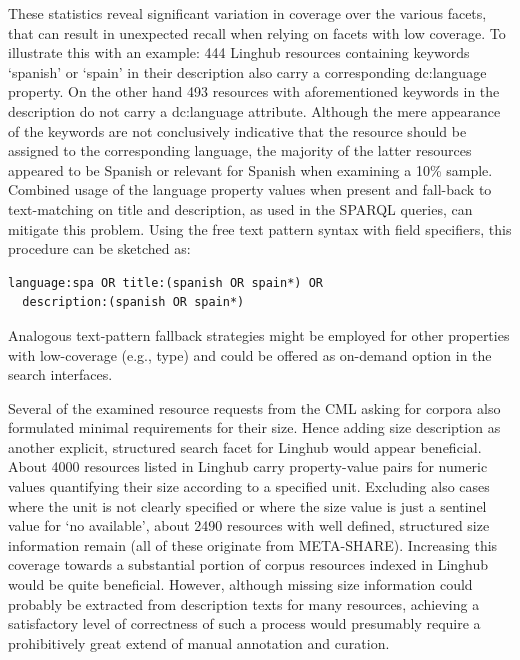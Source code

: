 \documentclass[smallextended]{svjour3}       %
\begin{document}
These statistics reveal significant variation in coverage over the various
facets, that can result in unexpected recall when relying on facets with low
coverage. To illustrate this with an example: 444 Linghub resources containing
keywords `spanish' or `spain' in their description also carry a corresponding
dc:language property. On the other hand 493 resources with aforementioned
keywords in the description do not carry a dc:language attribute. Although the
mere appearance of the keywords are not conclusively indicative that the
resource should be assigned to the corresponding language, the majority of the
latter resources appeared to be Spanish or relevant for Spanish when examining
a 10\% sample. %
Combined usage of the language
property values when present and fall-back to text-matching on title and
description, as used in the SPARQL queries, can mitigate this problem. Using the
free text pattern syntax with field specifiers, this procedure can be sketched
as: 

\begin{verbatim}
language:spa OR title:(spanish OR spain*) OR 
  description:(spanish OR spain*)
\end{verbatim}

Analogous text-pattern fallback strategies might be employed for other
properties with low-coverage (e.g., type) and could be offered as on-demand
option in the search interfaces. 

Several of the examined resource requests from the CML asking for corpora also
formulated minimal requirements for their size. Hence adding size description
as another explicit, structured search facet for Linghub would appear
beneficial. About 4000 resources listed in Linghub carry property-value pairs
for numeric values quantifying their size according to a specified
unit. Excluding also cases where the unit is not clearly specified or where the
size value is just a sentinel value for ‘no available’, about 2490 resources
with well defined, structured size information remain (all of these originate
from META-SHARE).  Increasing this coverage towards a substantial portion of
corpus resources indexed in Linghub would be quite beneficial. However, although
missing size information could probably be extracted from description texts for
many resources, achieving a satisfactory level of correctness of such a process
would presumably require a prohibitively great extend of manual annotation and
curation.
\end{document}
